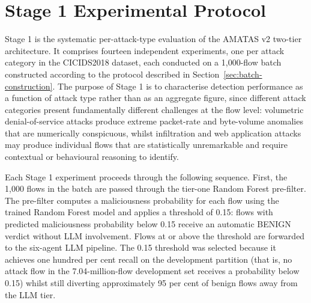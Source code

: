\documentclass[../main.tex]{subfiles}
\begin{document}
\section{Stage 1 Experimental Protocol}
\label{sec:stage1-protocol}

Stage 1 is the systematic per-attack-type evaluation of the AMATAS v2 two-tier architecture. It comprises fourteen independent experiments, one per attack category in the CICIDS2018 dataset, each conducted on a 1,000-flow batch constructed according to the protocol described in Section~\ref{sec:batch-construction}. The purpose of Stage 1 is to characterise detection performance as a function of attack type rather than as an aggregate figure, since different attack categories present fundamentally different challenges at the flow level: volumetric denial-of-service attacks produce extreme packet-rate and byte-volume anomalies that are numerically conspicuous, whilst infiltration and web application attacks may produce individual flows that are statistically unremarkable and require contextual or behavioural reasoning to identify.

Each Stage 1 experiment proceeds through the following sequence. First, the 1,000 flows in the batch are passed through the tier-one Random Forest pre-filter. The pre-filter computes a maliciousness probability for each flow using the trained Random Forest model and applies a threshold of 0.15: flows with predicted maliciousness probability below 0.15 receive an automatic BENIGN verdict without LLM involvement. Flows at or above the threshold are forwarded to the six-agent LLM pipeline. The 0.15 threshold was selected because it achieves one hundred per cent recall on the development partition (that is, no attack flow in the 7.04-million-flow development set receives a probability below 0.15) whilst still diverting approximately 95 per cent of benign flows away from the LLM tier.
\end{document}
